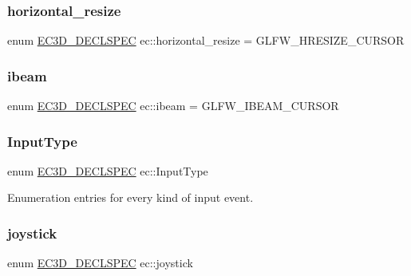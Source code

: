 \mbox{\label{namespaceec_a6331d0d47cac81ec8a5104b9c2f647fe}} 
\subsubsection{\texorpdfstring{horizontal\+\_\+resize}{horizontal\_resize}}
{\footnotesize\ttfamily enum \mbox{\hyperlink{_common_8h_aac42573e202ca3dd4d259c81691e2369}{E\+C3\+D\+\_\+\+D\+E\+C\+L\+S\+P\+EC}} ec\+::horizontal\+\_\+resize = G\+L\+F\+W\+\_\+\+H\+R\+E\+S\+I\+Z\+E\+\_\+\+C\+U\+R\+S\+OR\hspace{0.3cm}{\ttfamily [strong]}}

\mbox{\label{namespaceec_a11b97e3d63932d34e6fb306f5389cad0}} 
\subsubsection{\texorpdfstring{ibeam}{ibeam}}
{\footnotesize\ttfamily enum \mbox{\hyperlink{_common_8h_aac42573e202ca3dd4d259c81691e2369}{E\+C3\+D\+\_\+\+D\+E\+C\+L\+S\+P\+EC}} ec\+::ibeam = G\+L\+F\+W\+\_\+\+I\+B\+E\+A\+M\+\_\+\+C\+U\+R\+S\+OR\hspace{0.3cm}{\ttfamily [strong]}}

\mbox{\label{namespaceec_ae2d697393ea83b34b18ab14eb5dacbca}} 
\subsubsection{\texorpdfstring{Input\+Type}{InputType}}
{\footnotesize\ttfamily enum \mbox{\hyperlink{_common_8h_aac42573e202ca3dd4d259c81691e2369}{E\+C3\+D\+\_\+\+D\+E\+C\+L\+S\+P\+EC}} ec\+::\+Input\+Type\hspace{0.3cm}{\ttfamily [strong]}}



Enumeration entries for every kind of input event. 

\mbox{\label{namespaceec_a48a4c5a1e957c8419028491291e37634}} 
\subsubsection{\texorpdfstring{joystick}{joystick}}
{\footnotesize\ttfamily enum \mbox{\hyperlink{_common_8h_aac42573e202ca3dd4d259c81691e2369}{E\+C3\+D\+\_\+\+D\+E\+C\+L\+S\+P\+EC}} ec\+::joystick\hspace{0.3cm}{\ttfamily [strong]}}

